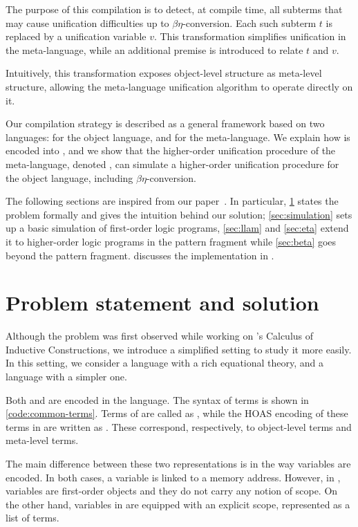 The purpose of this compilation is to detect, at compile time, all
subterms that may cause unification difficulties up to $\beta\eta$-conversion.
Each such subterm $t$ is replaced by a unification variable $v$. This
transformation simplifies unification in the meta-language, while an
additional premise is introduced to relate $t$ and $v$.

Intuitively, this transformation exposes object-level structure as
meta-level structure, allowing the meta-language unification
algorithm to operate directly on it.

Our compilation strategy is described as a general framework based on
two languages: \Fo{} for the object language, and \Ho{} for the
meta-language. We explain how \Fo{} is encoded into \Ho{}, and we show
that the higher-order unification procedure of the meta-language,
denoted \Ue{}, can simulate a higher-order unification procedure \Uo{}
for the object language, including $\beta\eta$-conversion.

The following sections are inspired from our paper~\cite{fissore2024}.
In particular, \cref{sec:problem-statement} states the problem formally and gives the
intuition behind our solution; \cref{sec:simulation} sets up a basic
simulation of first-order logic programs, \cref{sec:llam} and \cref{sec:eta}
extend it to higher-order logic programs in the pattern fragment
while \cref{sec:beta} goes beyond the pattern fragment.
 discusses the implementation in \elpi.

\section{Problem statement and solution} %
\label{sec:problem-statement}

Although the problem was first observed while working on \rocq's Calculus of
Inductive Constructions, we introduce a simplified setting to study it more
easily. In this setting, we consider a language \Fo{} with a rich equational
theory, and a language \Ho{} with a simpler one.

Both \Fo{} and \Ho{} are encoded in the \elpi language. The syntax of terms is
shown in \cref{code:common-terms}. Terms of \Fo{} are called as \otm, while
the HOAS encoding of these terms in \Ho{} are written as \mtm. 
These correspond, respectively, to
object-level terms and meta-level terms.

The main difference between these two representations is in the way variables
are encoded. In both cases, a variable is linked to a memory address. However,
in \Fo{}, variables are first-order objects and they do not carry any notion of
scope. On the other hand, variables in \Ho{} are equipped with an explicit
scope, represented as a list of terms.


